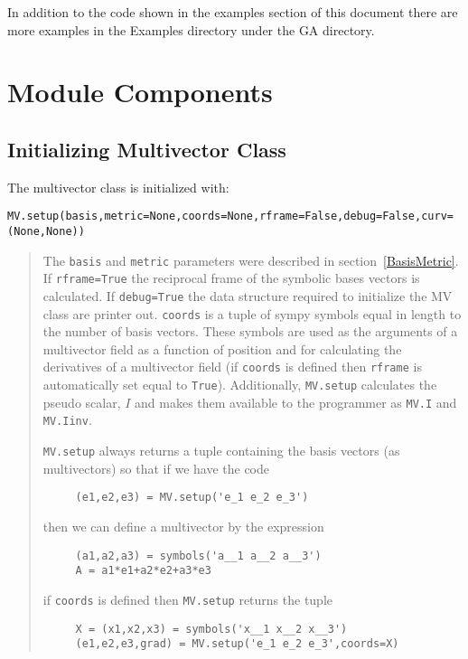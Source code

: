 \documentclass[10pt]{article}
\newcommand{\T}[1]{\texttt{#1}}
\begin{document}
In addition to the code shown in the examples section of this document there are more examples in the Examples directory under the
GA directory.

\section{Module Components}

\subsection{Initializing Multivector Class}

The multivector class is initialized with:


\T{MV.setup(basis,metric=None,coords=None,rframe=False,debug=False,curv=(None,None))}
\begin{quote}
   The \T{basis} and \T{metric} parameters were described in section~\ref{BasisMetric}. If
   \T{rframe=True} the reciprocal frame of the symbolic bases vectors is calculated.
   If \T{debug=True} the data structure required to initialize the MV class
   are printer out. \T{coords} is a tuple of sympy symbols equal in length to
   the number of basis vectors.  These symbols are used as the arguments of a
   multivector field as a function of position and for calculating the derivatives
   of a multivector field (if \T{coords} is defined then \T{rframe} is automatically
   set equal to \T{True}). Additionally, \T{MV.setup} calculates the pseudo scalar,
   $I$ and makes them available to the programmer as \T{MV.I} and \T{MV.Iinv}.

   \T{MV.setup} always returns a tuple containing the basis vectors (as multivectors)
   so that if we have the code

\begin{lstlisting}
     (e1,e2,e3) = MV.setup('e_1 e_2 e_3')
\end{lstlisting}

   then we can define a multivector by the expression

\begin{lstlisting}
     (a1,a2,a3) = symbols('a__1 a__2 a__3')
     A = a1*e1+a2*e2+a3*e3
\end{lstlisting}

   if \T{coords} is defined then \T{MV.setup} returns the tuple

\begin{lstlisting}
     X = (x1,x2,x3) = symbols('x__1 x__2 x__3')
     (e1,e2,e3,grad) = MV.setup('e_1 e_2 e_3',coords=X)
\end{lstlisting}


\end{quote}
\end{document}
